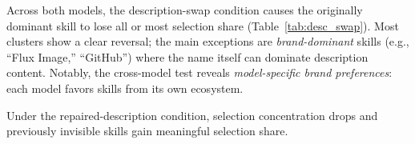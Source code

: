 \documentclass[11pt]{article}
\begin{document}
\begin{table}[t]
\centering\small
{}
\caption{Description-swap ablation: swapping descriptions
often transfers selection preference, with exceptions in
brand-dominant clusters.
$^*$Gemini reversal in tested clusters.
$^\dagger$Brand-dominant exceptions.
``Base'' = most-selected skill before swap.}
\label{tab:desc_swap}
\end{table}

Across both models, the description-swap condition
causes the originally dominant skill to lose all or
most selection share (Table~\ref{tab:desc_swap}).
Most clusters show a clear reversal;
the main exceptions are \emph{brand-dominant} skills
(e.g., ``Flux Image,'' ``GitHub'') where the name
itself can dominate description content.
Notably, the cross-model test reveals
\emph{model-specific brand preferences}: each model
favors skills from its own ecosystem.

Under the repaired-description condition,
selection concentration drops and previously invisible
skills gain meaningful selection share.
\end{document}
